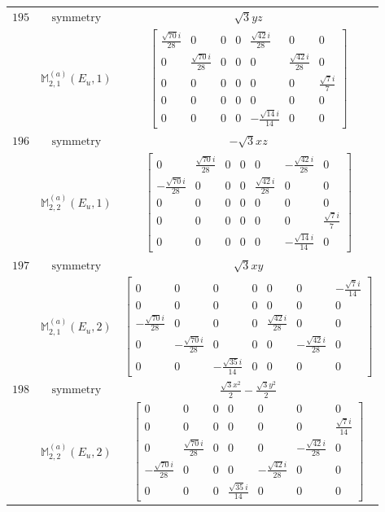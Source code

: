 \documentclass[fleqn,8pt,landscape]{jsarticle}
\begin{document}
\begin{longtable}{ccc}
$ 195 $ & $ \text{symmetry} $ & $ \sqrt{3} y z $ \\
$  $ & $ \mathbb{M}_{2,1}^{(a)}(E_{u},1) $ & $ \begin{bmatrix} \frac{\sqrt{70} i}{28} & 0 & 0 & 0 & \frac{\sqrt{42} i}{28} & 0 & 0 \\ 0 & \frac{\sqrt{70} i}{28} & 0 & 0 & 0 & \frac{\sqrt{42} i}{28} & 0 \\ 0 & 0 & 0 & 0 & 0 & 0 & \frac{\sqrt{7} i}{7} \\ 0 & 0 & 0 & 0 & 0 & 0 & 0 \\ 0 & 0 & 0 & 0 & - \frac{\sqrt{14} i}{14} & 0 & 0 \end{bmatrix} $ \\ \hline
$ 196 $ & $ \text{symmetry} $ & $ - \sqrt{3} x z $ \\
$  $ & $ \mathbb{M}_{2,2}^{(a)}(E_{u},1) $ & $ \begin{bmatrix} 0 & \frac{\sqrt{70} i}{28} & 0 & 0 & 0 & - \frac{\sqrt{42} i}{28} & 0 \\ - \frac{\sqrt{70} i}{28} & 0 & 0 & 0 & \frac{\sqrt{42} i}{28} & 0 & 0 \\ 0 & 0 & 0 & 0 & 0 & 0 & 0 \\ 0 & 0 & 0 & 0 & 0 & 0 & \frac{\sqrt{7} i}{7} \\ 0 & 0 & 0 & 0 & 0 & - \frac{\sqrt{14} i}{14} & 0 \end{bmatrix} $ \\ \hline
$ 197 $ & $ \text{symmetry} $ & $ \sqrt{3} x y $ \\
$  $ & $ \mathbb{M}_{2,1}^{(a)}(E_{u},2) $ & $ \begin{bmatrix} 0 & 0 & 0 & 0 & 0 & 0 & - \frac{\sqrt{7} i}{14} \\ 0 & 0 & 0 & 0 & 0 & 0 & 0 \\ - \frac{\sqrt{70} i}{28} & 0 & 0 & 0 & \frac{\sqrt{42} i}{28} & 0 & 0 \\ 0 & - \frac{\sqrt{70} i}{28} & 0 & 0 & 0 & - \frac{\sqrt{42} i}{28} & 0 \\ 0 & 0 & - \frac{\sqrt{35} i}{14} & 0 & 0 & 0 & 0 \end{bmatrix} $ \\ \hline
$ 198 $ & $ \text{symmetry} $ & $ \frac{\sqrt{3} x^{2}}{2} - \frac{\sqrt{3} y^{2}}{2} $ \\
$  $ & $ \mathbb{M}_{2,2}^{(a)}(E_{u},2) $ & $ \begin{bmatrix} 0 & 0 & 0 & 0 & 0 & 0 & 0 \\ 0 & 0 & 0 & 0 & 0 & 0 & \frac{\sqrt{7} i}{14} \\ 0 & \frac{\sqrt{70} i}{28} & 0 & 0 & 0 & - \frac{\sqrt{42} i}{28} & 0 \\ - \frac{\sqrt{70} i}{28} & 0 & 0 & 0 & - \frac{\sqrt{42} i}{28} & 0 & 0 \\ 0 & 0 & 0 & \frac{\sqrt{35} i}{14} & 0 & 0 & 0 \end{bmatrix} $ \\ \hline

\end{longtable}
\end{document}
